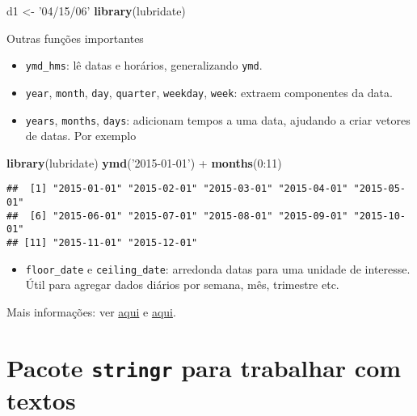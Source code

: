 \documentclass[]{book}
\newenvironment{Shaded}{\begin{snugshade}}{\end{snugshade}}
\newcommand{\KeywordTok}[1]{\textcolor[rgb]{0.13,0.29,0.53}{\textbf{{#1}}}}
\newcommand{\DecValTok}[1]{\textcolor[rgb]{0.00,0.00,0.81}{{#1}}}
\newcommand{\StringTok}[1]{\textcolor[rgb]{0.31,0.60,0.02}{{#1}}}
\newcommand{\NormalTok}[1]{{#1}}
\providecommand{\tightlist}{%
  \setlength{\itemsep}{0pt}\setlength{\parskip}{0pt}}
\begin{document}
\begin{Shaded}
\begin{Highlighting}[]
\NormalTok{d1 <-}\StringTok{ '04/15/06'}
\KeywordTok{library}\NormalTok{(lubridate)}
\end{Highlighting}
\end{Shaded}

Outras funções importantes

\begin{itemize}
\tightlist
\item
  \texttt{ymd\_hms}: lê datas e horários, generalizando \texttt{ymd}.
\item
  \texttt{year}, \texttt{month}, \texttt{day}, \texttt{quarter},
  \texttt{weekday}, \texttt{week}: extraem componentes da data.
\item
  \texttt{years}, \texttt{months}, \texttt{days}: adicionam tempos a uma
  data, ajudando a criar vetores de datas. Por exemplo
\end{itemize}

\begin{Shaded}
\begin{Highlighting}[]
\KeywordTok{library}\NormalTok{(lubridate)}
\KeywordTok{ymd}\NormalTok{(}\StringTok{'2015-01-01'}\NormalTok{) +}\StringTok{ }\KeywordTok{months}\NormalTok{(}\DecValTok{0}\NormalTok{:}\DecValTok{11}\NormalTok{)}
\end{Highlighting}
\end{Shaded}

\begin{verbatim}
##  [1] "2015-01-01" "2015-02-01" "2015-03-01" "2015-04-01" "2015-05-01"
##  [6] "2015-06-01" "2015-07-01" "2015-08-01" "2015-09-01" "2015-10-01"
## [11] "2015-11-01" "2015-12-01"
\end{verbatim}

\begin{itemize}
\tightlist
\item
  \texttt{floor\_date} e \texttt{ceiling\_date}: arredonda datas para
  uma unidade de interesse. Útil para agregar dados diários por semana,
  mês, trimestre etc.
\end{itemize}

Mais informações: ver
\href{https://cran.r-project.org/web/packages/lubridate/vignettes/lubridate.html}{aqui}
e
\href{https://www.jstatsoft.org/index.php/jss/article/view/v040i03/v40i03.pdf}{aqui}.

\section{\texorpdfstring{Pacote \texttt{stringr} para trabalhar com
textos}{Pacote stringr para trabalhar com textos}}\label{pacote-stringr-para-trabalhar-com-textos}
\end{document}
